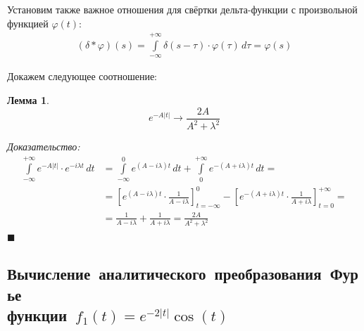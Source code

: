 \documentclass[11pt, oneside, final]{article} \sloppy
\numberwithin{equation}{section}
\newtheorem{lemma}[theorem]{Лемма}
\renewenvironment{proof}{
\noindent\textit{Доказательство: }} {\qed}
\newcommand \rarrow{\rightarrow}
\newcommand \intinf[1][{\,dt}]{ \int\limits_{-\infty}^{+\infty}{{#1}}}
\renewcommand \qed{$\blacksquare$}
\begin{document}
{ Установим также важное отношения для свёртки дельта-функции с произвольной функцией \(\varphi(t)\): 
\begin{align}\label{delta:conv}
    \boxed{\left(\delta * \varphi \right) (s) = \intinf[{\delta(s - \tau) \cdot \varphi(\tau)\, d\tau} = \varphi(s)]} 
\end{align}
}

\noindent Докажем следующее соотношение: 
\begin{lemma}
    \begin{equation}\label{fourier:exp_abs} 
        e^{-A|t|} \rarrow \dfrac{2A}{A^2 + \lambda^2} 
    \end{equation}
\end{lemma}
\begin{proof}
    \[ 
    \begin{split}
        \intinf[{e^{-A|t|} \cdot e^{-i\lambda t} \, dt}] &= \int\limits_{-\infty}^0{e^{(A - i\lambda) t} \, dt} + \int\limits_0^{+\infty}{e^{-(A + i\lambda) t} \, dt} = \\
        &= \left[ e^{(A - i\lambda)t} \cdot \frac{1}{A - i\lambda} \right]_{t = -\infty}^{0} - \left[ e^{-(A + i\lambda)t} \cdot \frac{1}{A + i\lambda} \right]_{t = 0}^{+\infty} = \\
        &=\frac{1}{A - i\lambda} + \frac{1}{A + i\lambda} = \frac{2A}{A^2 + \lambda^2} 
    \end{split}
    \]
\end{proof}


\subsection{Вычисление~аналитического~преобразования~Фурье\\функции~\(f_1(t) = e^{-2|t|} \cos(t)\)}
\end{document}
